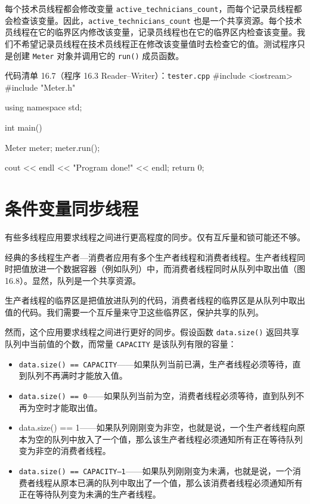 每个技术员线程都会修改变量 \texttt{active\_\allowbreak{}technicians\_\allowbreak{}count}，而每个记录员线程都会检查该变量。因此，\texttt{active\_\allowbreak{}technicians\_\allowbreak{}count} 也是一个共享资源。每个技术员线程在它的临界区内修改该变量，记录员线程也在它的临界区内检查该变量。我们不希望记录员线程在技术员线程正在修改该变量值时去检查它的值。测试程序只是创建 \texttt{Meter} 对象并调用它的 \texttt{run()} 成员函数。

\begin{codeboxt}{代码清单 16.7（程序 16.3 Reader–Writer）：\texttt{tester.\allowbreak{}cpp}}
#include <iostream>
#include "Meter.h"

using namespace std;

int main()
{
    Meter meter;
    meter.run();

    cout << endl << "Program done!" << endl;
    return 0;
}
\end{codeboxt}


\section{条件变量同步线程}

有些多线程应用要求线程之间进行更高程度的同步。仅有互斥量和锁可能还不够。

经典的多线程生产者—消费者应用有多个生产者线程和消费者线程。生产者线程同时把值放进一个数据容器（例如队列）中，而消费者线程同时从队列中取出值（图 16.8）。显然，队列是一个共享资源。


生产者线程的临界区是把值放进队列的代码，消费者线程的临界区是从队列中取出值的代码。我们需要一个互斥量来守卫这些临界区，保护共享的队列。

然而，这个应用要求线程之间进行更好的同步。假设函数 \texttt{data.\allowbreak{}size(\allowbreak{})\allowbreak{}} 返回共享队列中当前值的个数，而常量 \texttt{CAPACITY} 是该队列有限的容量：

\begin{itemize}
\item \texttt{data.\allowbreak{}size(\allowbreak{})\allowbreak{} =\allowbreak{}=\allowbreak{} CAPACITY}——如果队列当前已满，生产者线程必须等待，直到队列不再满时才能放入值。
\item \texttt{data.\allowbreak{}size(\allowbreak{})\allowbreak{} =\allowbreak{}=\allowbreak{} 0}——如果队列当前为空，消费者线程必须等待，直到队列不再为空时才能取出值。
\item data.size() == 1——如果队列刚刚变为非空，也就是说，一个生产者线程向原本为空的队列中放入了一个值，那么该生产者线程必须通知所有正在等待队列变为非空的消费者线程。
\item \texttt{data.\allowbreak{}size(\allowbreak{})\allowbreak{} =\allowbreak{}=\allowbreak{} CAPACITY–1}——如果队列刚刚变为未满，也就是说，一个消费者线程从原本已满的队列中取出了一个值，那么该消费者线程必须通知所有正在等待队列变为未满的生产者线程。
\end{itemize}

